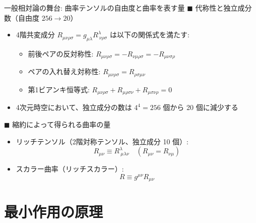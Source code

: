 \documentclass[unicode, aspectratio=169, 12pt]{beamer}
\begin{document}
\begin{frame}{一般相対論の舞台: 曲率テンソルの自由度と曲率を表す量}
    $\blacksquare$ 代称性と独立成分数（自由度 $256 \to 20$）
    \begin{itemize}\small
        \item 4階共変成分 $R_{\mu\nu\rho\sigma} = g_{\mu\lambda} R^\lambda_{\ \nu\rho\sigma}$ は以下の関係式を満たす:
        \begin{itemize}\footnotesize
            \item 前後ペアの反対称性: $R_{\mu\nu\rho\sigma} = -R_{\nu\mu\rho\sigma} = -R_{\mu\nu\sigma\rho}$
            \item ペアの入れ替え対称性: $R_{\mu\nu\rho\sigma} = R_{\rho\sigma\mu\nu}$
            \item 第1ビアンキ恒等式: $R_{\mu\nu\rho\sigma} + R_{\mu\rho\sigma\nu} + R_{\mu\sigma\nu\rho} = 0$
        \end{itemize}
        \item 4次元時空において、独立成分の数は $4^4=256$ 個から 20 個に減少する
    \end{itemize}

    \vspace{0.2em}
    $\blacksquare$ 縮約によって得られる曲率の量
    \begin{itemize}\small
        \item リッチテンソル（2階対称テンソル、独立成分 10 個）:
        \begin{equation*}
            R_{\mu\nu} \equiv R^\lambda_{\ \mu\lambda\nu} \quad (R_{\mu\nu} = R_{\nu\mu})
        \end{equation*}
        \item スカラー曲率（リッチスカラー）:
        \begin{equation*}
            R \equiv g^{\mu\nu} R_{\mu\nu}
        \end{equation*}
    \end{itemize}
\end{frame}

\section{最小作用の原理}
\end{document}
